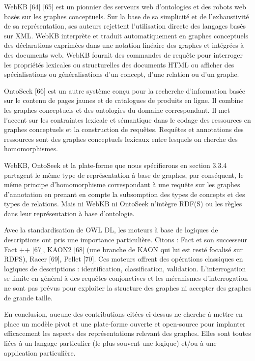 WebKB [64] [65] est un pionnier des serveurs web d'ontologies et des robots web basés sur les graphes conceptuels. Sur la base de sa simplicité et de l'exhaustivité de sa représentation, ses auteurs rejettent l'utilisation directe des langages basés sur XML. WebKB interprète et traduit automatiquement en graphes conceptuels des déclarations exprimées dans une notation linéaire des graphes et intégrées à des documents web. WebKB fournit des commandes de requête pour interroger les propriétés lexicales ou structurelles des documents HTML ou afficher des spécialisations ou généralisations d'un concept, d'une relation ou d'un graphe.

OntoSeek [66] est un autre système conçu pour la recherche d’information basée sur le contenu de pages jaunes et de catalogues de produits en ligne. Il combine les graphes conceptuels et des ontologies du domaine correspondant. Il met l'accent sur les contraintes lexicale et sémantique dans le codage des ressources en graphes conceptuels et la construction de requêtes. Requêtes et annotations des ressources sont des graphes conceptuels lexicaux entre lesquels on cherche des homomorphismes.

WebKB, OntoSeek et la plate-forme que nous spécifierons en section 3.3.4 partagent le même type de représentation à base de graphes, par conséquent, le même principe d’homomorphisme correspondant à une requête sur les graphes d'annotation en prenant en compte la subsomption des types de concepts et des types de relations. Mais ni WebKB ni OntoSeek n’intègre RDF(S) ou les règles dans leur représentation à base d’ontologie.

Avec la standardisation de OWL DL, les moteurs à base de logiques de descriptions ont pris une importance particulière. Citons : Fact et son successeur Fact ++ [67], KAON2 [68] (une branche de KAON qui lui est resté focalisé sur RDFS), Racer [69], Pellet [70]. Ces moteurs offrent des opérations classiques en logiques de descriptions : identification, classification, validation. L’interrogation se limite en général à des requêtes conjonctives et les mécanismes d’interrogation ne sont pas prévus pour exploiter la structure des graphes ni accepter des graphes de grande taille.

En conclusion, aucune des contributions citées ci-dessus ne cherche à mettre en place un modèle pivot et une plate-forme ouverte et open-source pour implanter efficacement les aspects des représentations relevant des graphes. Elles sont toutes liées à un langage particulier (le plus souvent une logique) et/ou à une application particulière.

